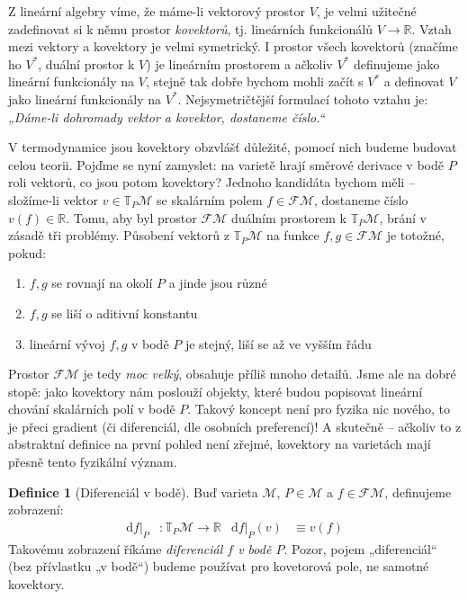 \documentclass{article}
\theoremstyle{definition}
\newtheorem{definition}[theorem]{Definice}
\newcommand{\const}[1]{\mathrm{#1}}
\renewcommand{\d}[1]{\const{d} #1}
\newcommand{\R}{\mathbb{R}}
\def\Manif{\mathcal{M}}
\def\Func{\mathcal{F}}
\def\Tang{\mathbb{T}}
\begin{document}
Z lineární algebry víme, že máme-li vektorový prostor $V$, je velmi užitečné zadefinovat si k němu prostor \textit{kovektorů}, tj. lineárních funkcionálů $V \to \R$. Vztah mezi vektory a kovektory je velmi symetrický. I prostor všech kovektorů (značíme ho $V^*$, duální prostor k $V$) je lineárním prostorem a ačkoliv $V^*$ definujeme jako lineární funkcionály na $V$, stejně tak dobře bychom mohli začít s $V^*$ a definovat $V$ jako lineární funkcionály na $V^*$. Nejsymetričtější formulací tohoto vztahu je: \textit{„Dáme-li dohromady vektor a kovektor, dostaneme číslo.“}

V termodynamice jsou kovektory obzvlášť důležité, pomocí nich budeme budovat celou teorii. Pojďme se nyní zamyslet: na varietě hrají směrové derivace v bodě $P$ roli vektorů, co jsou potom kovektory? Jednoho kandidáta bychom měli – složíme-li vektor $v \in \Tang_P\Manif$ se skalárním polem $f \in \Func\Manif$, dostaneme číslo $v(f) \in \R$. Tomu, aby byl prostor $\Func\Manif$ duálním prostorem k $\Tang_P\Manif$, brání v zásadě tři problémy. Působení vektorů z $\Tang_P\Manif$ na funkce $f,g\in\Func\Manif$ je totožné, pokud:
\begin{enumerate}
    \item $f,g$ se rovnají na okolí $P$ a jinde jsou různé
    \item $f,g$ se liší o aditivní konstantu
    \item lineární vývoj $f,g$ v bodě $P$ je stejný, liší se až ve vyšším řádu
\end{enumerate}
Prostor $\Func\Manif$ je tedy \textit{moc velký}, obsahuje příliš mnoho detailů. Jsme ale na dobré stopě: jako kovektory nám poslouží objekty, které budou popisovat lineární chování skalárních polí v bodě $P$. Takový koncept není pro fyzika nic nového, to je přeci gradient (či diferenciál, dle osobních preferencí)! A skutečně – ačkoliv to z abstraktní definice na první pohled není zřejmé, kovektory na varietách mají přesně tento fyzikální význam.

\begin{definition}[Diferenciál v bodě]
Buď varieta $\Manif$, $P \in \Manif$ a $f \in \Func\Manif$, definujeme zobrazení:
\begin{align*}
    \d{f}|_P &: \Tang_P\Manif \to \R
    &
    \d{f}|_P(v) &\equiv v(f)
\end{align*}
Takovému zobrazení říkáme \textit{diferenciál $f$ v bodě $P$}. Pozor, pojem „diferenciál“ (bez přívlastku „v bodě“) budeme používat pro kovetorová pole, ne samotné kovektory.
\end{definition}
\end{document}
